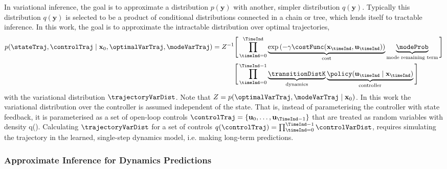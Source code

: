\documentclass{mimosis-class/mimosis}
\numberwithin{equation}{chapter}
\newcommand{\state}{\ensuremath{\mathbf{x}}}
\newcommand{\control}{\ensuremath{\mathbf{u}}}
\begin{document}
{In variational inference, the goal is to approximate a distribution \(p(\mathbf{y})\)
with another, simpler distribution \(q(\mathbf{y})\).
Typically this distribution \(q(\mathbf{y})\) is selected to be a product of conditional distributions connected in a
chain or tree, which lends itself to tractable inference.
In this work, the goal is to approximate the intractable distribution over optimal trajectories,
\begin{align} \label{eq-}
p(\stateTraj, \controlTraj \mid \state_0, \optimalVarTraj, \modeVarTraj)
= Z^{-1}
\Bigg[ \prod_{\timeInd=0}^{\TimeInd}
&\underbrace{\exp \left( - \gamma  \costFunc(\state_\timeInd, \control_\timeInd) \right)}_{\text{cost}}
\underbrace{\modeProb}_{\text{mode remaining term}}
\Bigg]
\nonumber \\
\Bigg[ \prod_{\timeInd=0}^{\TimeInd-1}
&\underbrace{ \transitionDistK}_{\text{dynamics}}
\underbrace{ \policy(\control_\timeInd \mid \state_\timeInd) }_{\text{controller}}
\Bigg]
\end{align}
with the variational distribution \(\trajectoryVarDist\).
Note that \(Z=p(\optimalVarTraj, \modeVarTraj \mid \state_0)\).
In this work the variational distribution over the controller is assumed independent of the state.
That is, instead of parameterising the controller with state feedback, it is parameterised as a set
of open-loop controls \(\controlTraj = \{\control_0, \ldots, \control_{\TimeInd-1}\}\) that are treated as random
variables with density q(\controlTraj).
Calculating \(\trajectoryVarDist\) for a set of controls
\(q(\controlTraj) = \prod_{\timeInd=0}^{\TimeInd-1} \controlVarDist\),
requires simulating the trajectory in the learned,
single-step dynamics model, i.e. making long-term predictions.

\subsubsection{Approximate Inference for Dynamics Predictions}
\label{sec:orga3fd5a7}

}
\end{document}
